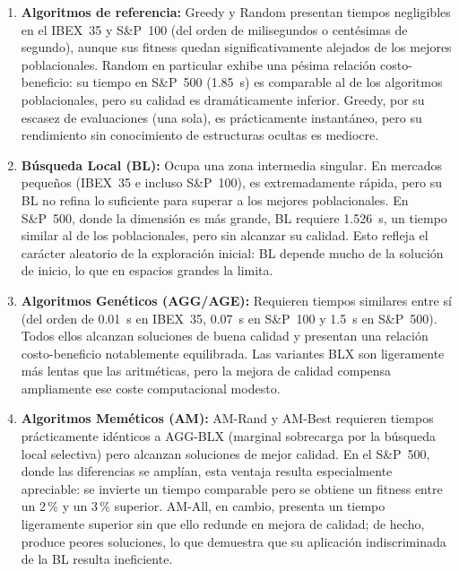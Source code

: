\begin{enumerate}
    \item \textbf{Algoritmos de referencia:} Greedy y Random presentan tiempos negligibles en el IBEX~35 y S\&P~100 (del orden de milisegundos o centésimas de segundo), aunque sus fitness quedan significativamente alejados de los mejores poblacionales. Random en particular exhibe una pésima relación costo-beneficio: su tiempo en S\&P~500 (1.85~s) es comparable al de los algoritmos poblacionales, pero su calidad es dramáticamente inferior. Greedy, por su escasez de evaluaciones (una sola), es prácticamente instantáneo, pero su rendimiento sin conocimiento de estructuras ocultas es mediocre.
    
    \item \textbf{Búsqueda Local (BL):} Ocupa una zona intermedia singular. En mercados pequeños (IBEX~35 e incluso S\&P~100), es extremadamente rápida, pero su BL no refina lo suficiente para superar a los mejores poblacionales. En S\&P~500, donde la dimensión es más grande, BL requiere 1.526~s, un tiempo similar al de los poblacionales, pero sin alcanzar su calidad. Esto refleja el carácter aleatorio de la exploración inicial: BL depende mucho de la solución de inicio, lo que en espacios grandes la limita.
    
    \item \textbf{Algoritmos Genéticos (AGG/AGE):} Requieren tiempos similares entre sí (del orden de 0.01~s en IBEX~35, 0.07~s en S\&P~100 y 1.5~s en S\&P~500). Todos ellos alcanzan soluciones de buena calidad y presentan una relación costo-beneficio notablemente equilibrada. Las variantes BLX son ligeramente más lentas que las aritméticas, pero la mejora de calidad compensa ampliamente ese coste computacional modesto.
    
    \item \textbf{Algoritmos Meméticos (AM):} AM-Rand y AM-Best requieren tiempos prácticamente idénticos a AGG-BLX (marginal sobrecarga por la búsqueda local selectiva) pero alcanzan soluciones de mejor calidad. En el S\&P~500, donde las diferencias se amplían, esta ventaja resulta especialmente apreciable: se invierte un tiempo comparable pero se obtiene un fitness entre un 2\,\% y un 3\,\% superior. AM-All, en cambio, presenta un tiempo ligeramente superior sin que ello redunde en mejora de calidad; de hecho, produce peores soluciones, lo que demuestra que su aplicación indiscriminada de la BL resulta ineficiente.
\end{enumerate}

